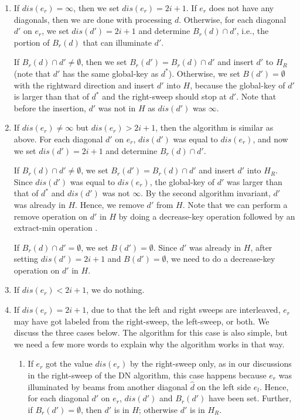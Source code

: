 \documentclass[english,runningheads,11pt]{llncs-revised}
\def\hatd{\hat{d}}
\begin{document}
\begin{enumerate}
\item
If $dis(e_r)=\infty$, then we set $dis(e_r)=2i+1$. If $e_r$ does not
have any diagonals, then we are done with processing $d$. Otherwise,
for each diagonal $d'$ on $e_r$, we set $dis(d')=2i+1$ and determine
$B_r(d)\cap d'$, i.e., the portion of $B_r(d)$ that can illuminate $d'$.


If $B_r(d)\cap d'\neq \emptyset$, then we set $B_r(d')=B_r(d)\cap
d'$ and insert $d'$ to $H_R$ (note that $d'$ has the same global-key as $d^*$).
Otherwise, we set $B(d')=\emptyset$ with the rightward direction and insert $d'$ into $H$, because the global-key of $d'$ is larger than that of $d^*$ and the right-sweep should stop at $d'$. Note that before the insertion, $d'$ was not in $H$ as $dis(d')$ was $\infty$.

\item
If $dis(e_r)\neq \infty$ but $dis(e_r)>2i+1$, then the algorithm is
similar as above. For each diagonal $d'$ on $e_r$, $dis(d')$ was equal to $dis(e_r)$, and now we set $dis(d')=2i+1$ and determine $B_r(d)\cap d'$.

If $B_r(d)\cap d'\neq \emptyset$,
we set $B_r(d')=B_r(d)\cap d'$ and insert $d'$ into $H_R$.
Since $dis(d')$ was equal to $dis(e_r)$, the global-key of $d'$ was larger than that of $d^*$ and $dis(d')$ was not $\infty$. By the second algorithm invariant, $d'$ was already in $H$.
Hence, we remove $d'$ from $H$. Note that we can perform a remove operation on $d'$ in
$H$ by doing a decrease-key operation followed by an extract-min
operation \cite{ref:CLRS09}.

If $B_r(d)\cap d'= \emptyset$, we set $B(d')=\emptyset$.
Since  $d'$ was already in $H$,
after setting $dis(d')=2i+1$ and  $B(d')=\emptyset$,  we need to do a
decrease-key operation on $d'$ in $H$.

\item
If $dis(e_r)<2i+1$, we do nothing.

\item
If $dis(e_r)=2i+1$, due to that the left and right sweeps are
interleaved, $e_r$ may have got labeled from the right-sweep, the
left-sweep, or both.
We discuss the three cases below. The algorithm for this case is also simple, but we need a few more words to explain why the algorithm works in that way.

\begin{enumerate}
\item
If $e_r$ got the value $dis(e_r)$ by the right-sweep only, as in
our discussions in the right-sweep of the DN algorithm,
this case happens because $e_r$ was illuminated by beams from
another diagonal $\hatd$ on the left side $e_l$. Hence, for each
diagonal $d'$ on $e_r$, $dis(d')$ and $B_r(d')$ have been set.
Further, if $B_r(d')=\emptyset$, then $d'$ is in $H$; otherwise $d'$
is in $H_R$.


\end{enumerate}
\end{enumerate}
\end{document}
